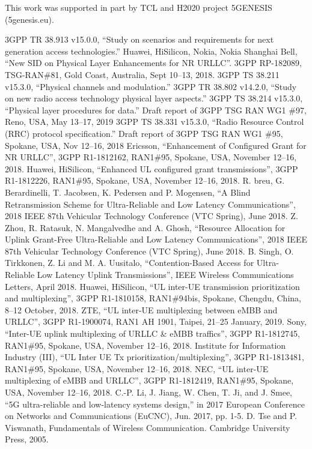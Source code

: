 \documentclass{ieeeaccess}
\begin{document}
This work was supported in part by TCL and H2020 project 5GENESIS (5genesis.eu).

\begin{thebibliography}{00}

 3GPP TR 38.913 v15.0.0, ``Study on scenarios and requirements for next generation access technologies.''
 Huawei, HiSilicon, Nokia, Nokia Shanghai Bell, ``New SID on Physical Layer Enhancements for NR URLLC''. 3GPP RP-182089, TSG-RAN\#81, Gold Coast, Australia, Sept 10--13, 2018.
 3GPP TS 38.211 v15.3.0, ``Physical channels and modulation.''
 3GPP TR 38.802 v14.2.0, ``Study on new radio access technology physical layer aspects.''
 3GPP TS 38.214 v15.3.0, ``Physical layer procedures for data.''
 Draft report of 3GPP TSG RAN WG1 \#97, Reno, USA, May 13--17, 2019
 3GPP TS 38.331 v15.3.0, ``Radio Resource Control (RRC) protocol specification.''
 Draft report of 3GPP TSG RAN WG1 \#95, Spokane, USA, Nov 12--16, 2018
 Ericsson, ``Enhancement of Configured Grant for NR URLLC'', 3GPP R1-1812162, RAN1\#95, Spokane, USA, November 12--16, 2018.
 Huawei, HiSilicon, ``Enhanced UL configured grant transmissions'', 3GPP R1-1812226, RAN1\#95, Spokane, USA, November 12--16, 2018.
 R. breu, G. Berardinelli, T. Jacobsen, K. Pedersen and P. Mogensen, ``A Blind Retransmission Scheme for Ultra-Reliable and Low Latency Communications'', 2018 IEEE 87th Vehicular Technology Conference (VTC Spring), June 2018.
 Z. Zhou, R. Ratasuk, N. Mangalvedhe and A. Ghosh, ``Resource Allocation for Uplink Grant-Free Ultra-Reliable and Low Latency Communications'', 2018 IEEE 87th Vehicular Technology Conference (VTC Spring), June 2018.
 B. Singh, O. Tirkkonen, Z. Li and M. A. Uusitalo, ``Contention-Based Access for Ultra-Reliable Low Latency Uplink Transmissions'',  IEEE Wireless Communications Letters, April 2018.
 Huawei, HiSilicon, ``UL inter-UE transmission prioritization and multiplexing'', 3GPP R1-1810158, RAN1\#94bis, Spokane, Chengdu, China, 8--12 October, 2018.
 ZTE, ``UL inter-UE multiplexing between eMBB and URLLC'', 3GPP R1-1900074, RAN1 AH 1901, Taipei,  21--25 January, 2019.
  Sony, ``Inter-UE uplink multiplexing of URLLC \& eMBB traffics'', 3GPP R1-1812745, RAN1\#95, Spokane, USA, November 12--16, 2018.
  Institute for Information Industry (III), ``UL Inter UE Tx prioritization/multiplexing'', 3GPP R1-1813481, RAN1\#95, Spokane, USA, November 12--16, 2018.
  NEC, ``UL inter-UE multiplexing of eMBB and URLLC'', 3GPP R1-1812419, RAN1\#95, Spokane, USA, November 12--16, 2018.
  C.-P. Li, J. Jiang, W. Chen, T. Ji, and J. Smee, ``5G ultra-reliable and low-latency systems design,'' in 2017 European Conference on Networks and Communications (EuCNC), Jun. 2017, pp. 1-5. 
 D. Tse and P. Viswanath, Fundamentals of Wireless Communication. Cambridge University Press, 2005. 


\end{thebibliography}
\end{document}
